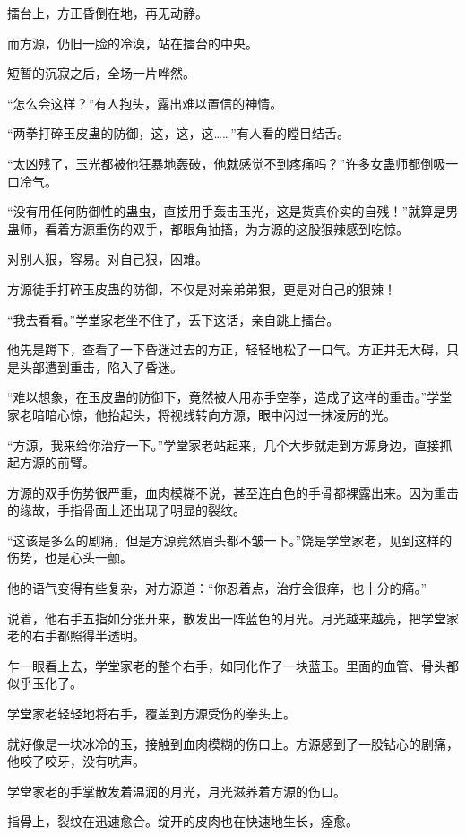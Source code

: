 
\begin{this_body}

擂台上，方正昏倒在地，再无动静。

而方源，仍旧一脸的冷漠，站在擂台的中央。

短暂的沉寂之后，全场一片哗然。

“怎么会这样？”有人抱头，露出难以置信的神情。

“两拳打碎玉皮蛊的防御，这，这，这……”有人看的瞠目结舌。

“太凶残了，玉光都被他狂暴地轰破，他就感觉不到疼痛吗？”许多女蛊师都倒吸一口冷气。

“没有用任何防御性的蛊虫，直接用手轰击玉光，这是货真价实的自残！”就算是男蛊师，看着方源重伤的双手，都眼角抽搐，为方源的这股狠辣感到吃惊。

对别人狠，容易。对自己狠，困难。

方源徒手打碎玉皮蛊的防御，不仅是对亲弟弟狠，更是对自己的狠辣！

“我去看看。”学堂家老坐不住了，丢下这话，亲自跳上擂台。

他先是蹲下，查看了一下昏迷过去的方正，轻轻地松了一口气。方正并无大碍，只是头部遭到重击，陷入了昏迷。

“难以想象，在玉皮蛊的防御下，竟然被人用赤手空拳，造成了这样的重击。”学堂家老暗暗心惊，他抬起头，将视线转向方源，眼中闪过一抹凌厉的光。

“方源，我来给你治疗一下。”学堂家老站起来，几个大步就走到方源身边，直接抓起方源的前臂。

方源的双手伤势很严重，血肉模糊不说，甚至连白色的手骨都裸露出来。因为重击的缘故，手指骨面上还出现了明显的裂纹。

“这该是多么的剧痛，但是方源竟然眉头都不皱一下。”饶是学堂家老，见到这样的伤势，也是心头一颤。

他的语气变得有些复杂，对方源道：“你忍着点，治疗会很痒，也十分的痛。”

说着，他右手五指如分张开来，散发出一阵蓝色的月光。月光越来越亮，把学堂家老的右手都照得半透明。

乍一眼看上去，学堂家老的整个右手，如同化作了一块蓝玉。里面的血管、骨头都似乎玉化了。

学堂家老轻轻地将右手，覆盖到方源受伤的拳头上。

就好像是一块冰冷的玉，接触到血肉模糊的伤口上。方源感到了一股钻心的剧痛，他咬了咬牙，没有吭声。

学堂家老的手掌散发着温润的月光，月光滋养着方源的伤口。

指骨上，裂纹在迅速愈合。绽开的皮肉也在快速地生长，痊愈。


\end{this_body}
